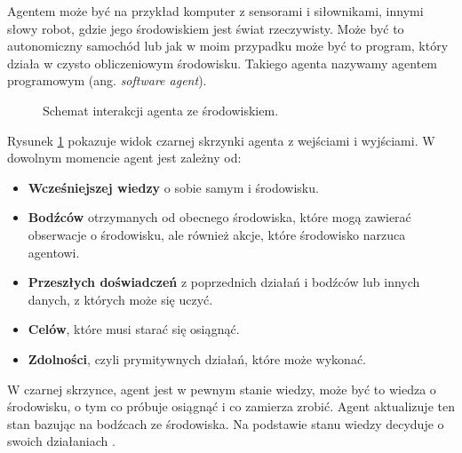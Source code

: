 \documentclass[a4paper, 12pt,oneside]{book}
\begin{document}
Agentem może być na przykład komputer z sensorami i siłownikami, innymi słowy
robot, gdzie jego środowiskiem jest świat rzeczywisty. Może być to autonomiczny
samochód lub jak w moim przypadku może być to program, który
działa w czysto obliczeniowym środowisku. Takiego agenta nazywamy agentem
programowym (ang. \textit{software agent}).
\begin{figure}[!htb] 
\begin{center}
\end{center}
\caption{Schemat interakcji agenta ze środowiskiem.}
\label{rl_figure}
\end{figure}

Rysunek \ref{rl_figure} pokazuje widok czarnej skrzynki agenta z wejściami
i wyjściami. W dowolnym momencie agent jest zależny od:
\begin{itemize}
	\setlength\itemsep{-0.4em}
	\item \textbf{Wcześniejszej wiedzy} o sobie samym i środowisku.
	\item \textbf{Bodźców} otrzymanych od obecnego
		środowiska, które mogą zawierać obserwacje o
		środowisku, ale również akcje, które środowisko
		narzuca agentowi.
	\item \textbf{Przeszłych doświadczeń} z poprzednich
		działań i bodźców lub innych danych, z których
		może się uczyć.
	\item \textbf{Celów}, które musi starać się osiągnąć.
	\item \textbf{Zdolności}, czyli prymitywnych działań, które
		może wykonać.
\end{itemize}
W czarnej skrzynce, agent jest w pewnym stanie wiedzy, może być to wiedza o
środowisku, o tym co próbuje osiągnąć i co zamierza zrobić. Agent aktualizuje
ten stan bazując na bodźcach ze środowiska. Na podstawie stanu wiedzy decyduje
o swoich działaniach \cite{ai_foundations_agents_situated}.
\end{document}
